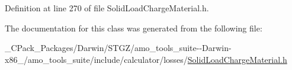 Definition at line 270 of file Solid\+Load\+Charge\+Material.\+h.



The documentation for this class was generated from the following file\+:\begin{DoxyCompactItemize}
\item 
\+\_\+\+C\+Pack\+\_\+\+Packages/\+Darwin/\+S\+T\+G\+Z/amo\+\_\+tools\+\_\+suite-\/-\/\+Darwin-\/x86\+\_/amo\+\_\+tools\+\_\+suite/include/calculator/losses/\hyperlink{___c_pack___packages_2_darwin_2_s_t_g_z_2amo__tools__suite--_darwin-x86__64_2amo__tools__suite_24924830b9aa131be7fc658c83ea6c4c5}{Solid\+Load\+Charge\+Material.\+h}\end{DoxyCompactItemize}
